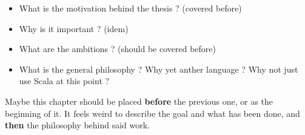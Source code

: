 
\begin{itemize}
    \item What is the motivation behind the thesis ? (covered before)
    \item Why is it important ? (idem)
    \item What are the ambitions ? (should be covered before)
    \item What is the general philosophy ?
    Why yet anther language ?
    Why not just use Scala at this point ?

\end{itemize}

Maybe this chapter should be placed \textbf{before} the previous one, or as the beginning of it.
It feels weird to describe the goal and what has been done, and \textbf{then} the philosophy behind said work.